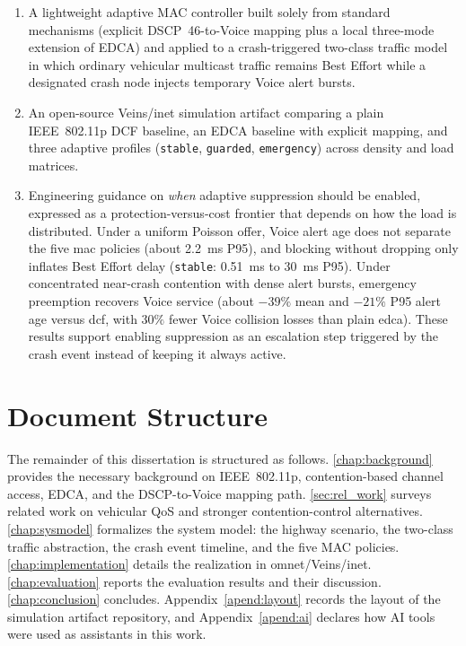 \begin{enumerate}
	\item A lightweight adaptive MAC controller built solely from standard mechanisms (explicit DSCP~46-to-Voice mapping plus a local three-mode extension of EDCA) and applied to a crash-triggered two-class traffic model in which ordinary vehicular multicast traffic remains Best Effort while a designated crash node injects temporary Voice alert bursts.
	\item An open-source Veins/\gls{inet} simulation artifact \cite{aguiar2026_veins_qos} comparing a plain IEEE~802.11p DCF baseline, an EDCA baseline with explicit mapping, and three adaptive profiles (\texttt{stable}, \texttt{guarded}, \texttt{emergency}) across density and load matrices.
	\item Engineering guidance on \emph{when} adaptive suppression should be enabled, expressed as a protection-versus-cost frontier that depends on how the load is distributed. Under a uniform Poisson offer, Voice alert age does not separate the five \gls{mac} policies (about 2.2~ms P95), and blocking without dropping only inflates Best Effort delay (\texttt{stable}: 0.51~ms to 30~ms P95). Under concentrated near-crash contention with dense alert bursts, emergency preemption recovers Voice service (about $-39\%$ mean and $-21\%$ P95 alert age versus \gls{dcf}, with $30\%$ fewer Voice collision losses than plain \gls{edca}). These results support enabling suppression as an escalation step triggered by the crash event instead of keeping it always active.
\end{enumerate}

\section{Document Structure}
\label{sec:intro:structure}

The remainder of this dissertation is structured as follows. \autoref{chap:background} provides the necessary background on IEEE~802.11p, contention-based channel access, EDCA, and the DSCP-to-Voice mapping path. \autoref{sec:rel_work} surveys related work on vehicular QoS and stronger contention-control alternatives. \autoref{chap:sysmodel} formalizes the system model: the highway scenario, the two-class traffic abstraction, the crash event timeline, and the five MAC policies. \autoref{chap:implementation} details the realization in \gls{omnet}/Veins/\gls{inet}. \autoref{chap:evaluation} reports the evaluation results and their discussion. \autoref{chap:conclusion} concludes. Appendix~\ref{apend:layout} records the layout of the simulation artifact repository, and Appendix~\ref{apend:ai} declares how AI tools were used as assistants in this work.
